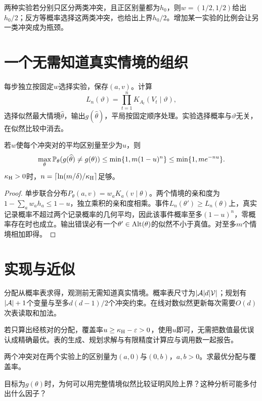 两种实验若分别只区分两类冲突，且正区别量都为$h_0$，则$w=(1/2,1/2)$给出$h_0/2$；反方等概率选择这两类冲突，也给出上界$h_0/2$。增加某一实验的比例会让另一类冲突成为瓶颈。

\section{一个无需知道真实情境的组织}
每步独立按固定$w$选择实验，保存$(a,v)$。计算
\[
 L_n(\vartheta)=\prod_{t=1}^nK_{A_t}(V_t\mid\vartheta),
\]
选择似然最大情境$\widehat\theta$，输出$g(\widehat\theta)$，平局按固定顺序处理。实验选择概率与$\vartheta$无关，在似然比较中消去。

\begin{theorem}[覆盖率的可靠性保证]
\label{thm:upper}
若$w$使每个冲突对的平均区别量至少为$u$，则
\[
 \max_\theta\mathbb P_\theta(g(\widehat\theta)\ne g(\theta))
 \le\min\{1,m(1-u)^n\}\le\min\{1,me^{-nu}\}.
\]
$\kappa_{\mathrm H}>0$时，$n=\lceil\ln(m/\delta)/\kappa_{\mathrm H}\rceil$足够。
\end{theorem}
\begin{proof}
单步联合分布$P_\theta(a,v)=w_aK_a(v\mid\theta)$。两个情境的亲和度为$1-\sum_aw_ah_a\le1-u$，独立乘积的亲和度相乘。事件$L_n(\theta')\ge L_n(\theta)$上，真实记录概率不超过两个记录概率的几何平均，因此该事件概率至多$(1-u)^n$，零概率存在时也成立。输出错误必有一个$\theta'\in\operatorname{Alt}(\theta)$的似然不小于真值。对至多$m$个情境相加即得。
\end{proof}

\section{实现与近似}
分配从概率表求得，观测前无需知道真实情境。概率表尺寸为$|\mathcal A|d|\mathcal V|$；规划有$|\mathcal A|+1$个变量与至多$d(d-1)/2$个冲突约束。在线对数似然更新每次需要$O(d)$次表读取和加法。

若只算出经核对的分配，覆盖率$u\ge\kappa_{\mathrm H}-\varepsilon>0$，使用$u$即可，无需把数值最优误认成精确最优。表的生成、规划求解与有限精度计算应与调用数一起报告。
\begin{exercise}两个冲突对在两个实验上的区别量为$(a,0)$与$(0,b)$，$a,b>0$。求最优分配与覆盖率。\end{exercise}
\begin{exercise}目标为$g(\theta)$时，为何可以用完整情境似然比较证明风险上界？这种分析可能多付出什么因子？\end{exercise}
